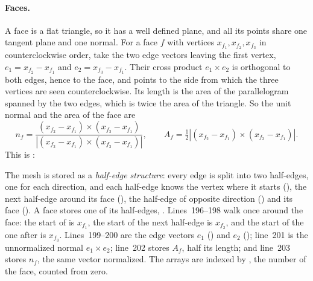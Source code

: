 \paragraph{Faces.} A face is a flat triangle, so it has a well defined plane, and all its points share one tangent plane and one normal. For a face $f$ with vertices $x_{f_1}, x_{f_2}, x_{f_3}$ in counterclockwise order, take the two edge vectors leaving the first vertex, $e_1 = x_{f_2} - x_{f_1}$ and $e_2 = x_{f_3} - x_{f_1}$. Their cross product $e_1 \times e_2$ is orthogonal to both edges, hence to the face, and points to the side from which the three vertices are seen counterclockwise. Its length is the area of the parallelogram spanned by the two edges, which is twice the area of the triangle. So the unit normal and the area of the face are
\begin{equation}
\label{eqn:face_normal}
n_f = \frac{(x_{f_2} - x_{f_1}) \times (x_{f_3} - x_{f_1})}{|(x_{f_2} - x_{f_1}) \times (x_{f_3} - x_{f_1})|}, \qquad A_f = \tfrac12 |(x_{f_2} - x_{f_1}) \times (x_{f_3} - x_{f_1})|.
\end{equation}
This is :

The mesh is stored as a \emph{half-edge structure}: every edge is split into two half-edges, one for each direction, and each half-edge knows the vertex where it starts (), the next half-edge around its face (), the half-edge of opposite direction () and its face (). A face stores one of its half-edges, . Lines~196--198 walk once around the face: the start of  is $x_{f_1}$, the start of the next half-edge is $x_{f_2}$, and the start of the one after is $x_{f_3}$. Lines~199--200 are the edge vectors $e_1$ () and $e_2$ (); line~201 is the unnormalized normal $e_1 \times e_2$; line~202 stores $A_f$, half its length; and line~203 stores $n_f$, the same vector normalized. The arrays are indexed by , the number of the face, counted from zero.

